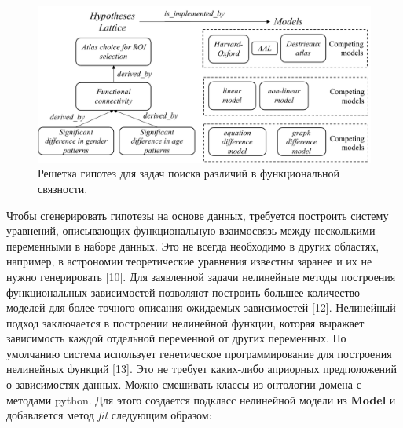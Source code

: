 \begin{figure}[ht]
    \centering
    \includegraphics[width=1.0\linewidth]{images/Hypothesis_Lattice.pdf}
    \caption{Решетка гипотез для задач поиска различий в функциональной связности.}\label{fig:Hypothesis_lattice}
\end{figure}

Чтобы сгенерировать гипотезы на основе данных, требуется построить систему уравнений, описывающих функциональную 
взаимосвязь между несколькими переменными в наборе данных. Это не всегда необходимо в других областях, например, 
в астрономии теоретические уравнения известны заранее и их не нужно генерировать [10].
Для заявленной задачи нелинейные методы построения функциональных зависимостей позволяют построить большее 
количество моделей для более точного описания ожидаемых зависимостей [12]. Нелинейный подход заключается в построении 
нелинейной функции, которая выражает зависимость каждой отдельной переменной от других переменных. По умолчанию 
система использует генетическое программирование для построения нелинейных функций [13]. Это не требует 
каких-либо априорных предположений о зависимостях данных. Можно смешивать классы из онтологии домена с методами python. 
Для этого создается подкласс нелинейной модели из \textbf{Model} и добавляется метод \textit{fit} следующим образом:

